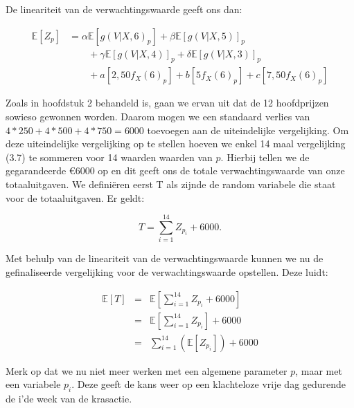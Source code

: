 De lineariteit van de verwachtingswaarde geeft ons dan:

\begin{equation}
\begin{aligned}
	\mathbb{E}\left[Z_{p} \right] &=
    \alpha\mathbb{E}[g(V|X,6)_{p}] + \beta\mathbb{E}[g(V|X,5)]_{p} \\
    &\qquad{}+ \gamma\mathbb{E}[g(V|X,4)]_{p} + \delta\mathbb{E}[g(V|X,3)]_{p}  \\
    &\qquad{}+ a[2,50f_{X}(6)_{p}] + b[5f_{X}(6)_{p}] + c[7,50f_{X}(6)_{p}]
\end{aligned}
\end{equation}

Zoals in hoofdstuk 2 behandeld is, gaan we ervan uit dat de 12 hoofdprijzen sowieso gewonnen worden. Daarom mogen we een standaard verlies van $4*250 + 4*500 + 4*750 = 6000$ toevoegen aan de uiteindelijke vergelijking. Om deze uiteindelijke vergelijking op te stellen hoeven we enkel 14 maal vergelijking (3.7) te sommeren voor 14 waarden waarden van $p$. Hierbij tellen we de gegarandeerde \euro6000 op en dit geeft ons de totale verwachtingswaarde van onze totaaluitgaven. We definiëren eerst T als zijnde de random variabele die staat voor de totaaluitgaven. Er geldt:

\begin{equation}
T = \sum_{i=1}^{14} Z_{p_{i}} + 6000.
\end{equation}

Met behulp van de lineariteit van de verwachtingswaarde kunnen we nu de gefinaliseerde vergelijking voor de verwachtingswaarde opstellen. Deze luidt:

\begin{equation}
\begin{aligned}
\mathbb{E}[T] &=& \mathbb{E}\left[\sum_{i=1}^{14} Z_{p_{i}} + 6000\right]\\
  &=& \mathbb{E}\left[\sum_{i=1}^{14} Z_{p_{i}} \right] + 6000\\
  &=&  \sum_{i=1}^{14} \left( \mathbb{E}[Z_{p_{i}}] \right) + 6000
\end{aligned}
\end{equation}

Merk op dat we nu niet meer werken met een algemene parameter $p$, maar met een variabele $p_{i}$. Deze geeft de kans weer op een klachteloze vrije dag gedurende de i'de week van de krasactie.

